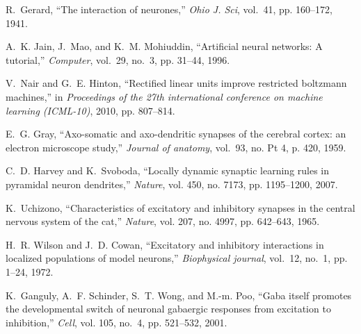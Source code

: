 \documentclass[conference]{IEEEtran}
\begin{document}
\begin{thebibliography}{10}
R.~Gerard, ``The interaction of neurones,'' \emph{Ohio J. Sci}, vol.~41, pp.
160--172, 1941.

A.~K. Jain, J.~Mao, and K.~M. Mohiuddin, ``Artificial neural networks: A
tutorial,'' \emph{Computer}, vol.~29, no.~3, pp. 31--44, 1996.

V.~Nair and G.~E. Hinton, ``Rectified linear units improve restricted boltzmann
machines,'' in \emph{Proceedings of the 27th international conference on
machine learning (ICML-10)}, 2010, pp. 807--814.

E.~G. Gray, ``Axo-somatic and axo-dendritic synapses of the cerebral cortex: an
electron microscope study,'' \emph{Journal of anatomy}, vol.~93, no. Pt 4, p.
420, 1959.

C.~D. Harvey and K.~Svoboda, ``Locally dynamic synaptic learning rules in
pyramidal neuron dendrites,'' \emph{Nature}, vol. 450, no. 7173, pp.
1195--1200, 2007.

K.~Uchizono, ``Characteristics of excitatory and inhibitory synapses in the
central nervous system of the cat,'' \emph{Nature}, vol. 207, no. 4997, pp.
642--643, 1965.

H.~R. Wilson and J.~D. Cowan, ``Excitatory and inhibitory interactions in
localized populations of model neurons,'' \emph{Biophysical journal},
vol.~12, no.~1, pp. 1--24, 1972.

K.~Ganguly, A.~F. Schinder, S.~T. Wong, and M.-m. Poo, ``Gaba itself promotes
the developmental switch of neuronal gabaergic responses from excitation to
inhibition,'' \emph{Cell}, vol. 105, no.~4, pp. 521--532, 2001.


\end{thebibliography}



\end{document}
